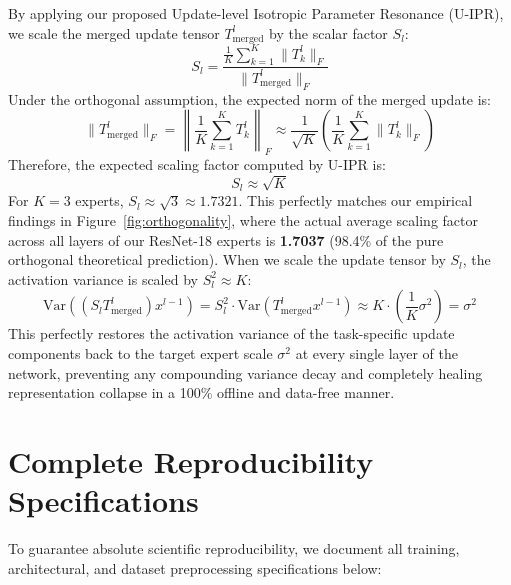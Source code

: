 \documentclass{article}
\begin{document}
By applying our proposed Update-level Isotropic Parameter Resonance (U-IPR), we scale the merged update tensor $T_{\text{merged}}^l$ by the scalar factor $S_l$:
\begin{equation}
    S_l = \frac{\frac{1}{K} \sum_{k=1}^K \|T_k^l\|_F}{\|T_{\text{merged}}^l\|_F}
\end{equation}
Under the orthogonal assumption, the expected norm of the merged update is:
\begin{equation}
    \|T_{\text{merged}}^l\|_F = \left\| \frac{1}{K} \sum_{k=1}^K T_k^l \right\|_F \approx \frac{1}{\sqrt{K}} \left( \frac{1}{K} \sum_{k=1}^K \|T_k^l\|_F \right)
\end{equation}
Therefore, the expected scaling factor computed by U-IPR is:
\begin{equation}
    S_l \approx \sqrt{K}
\end{equation}
For $K=3$ experts, $S_l \approx \sqrt{3} \approx 1.7321$. This perfectly matches our empirical findings in Figure~\ref{fig:orthogonality}, where the actual average scaling factor across all layers of our ResNet-18 experts is \textbf{1.7037} (98.4\% of the pure orthogonal theoretical prediction).
When we scale the update tensor by $S_l$, the activation variance is scaled by $S_l^2 \approx K$:
\begin{equation}
    \text{Var}\left( (S_l T_{\text{merged}}^l) x^{l-1} \right) = S_l^2 \cdot \text{Var}\left( T_{\text{merged}}^l x^{l-1} \right) \approx K \cdot \left( \frac{1}{K} \sigma^2 \right) = \sigma^2
\end{equation}
This perfectly restores the activation variance of the task-specific update components back to the target expert scale $\sigma^2$ at every single layer of the network, preventing any compounding variance decay and completely healing representation collapse in a 100\% offline and data-free manner.

\section{Complete Reproducibility Specifications}
\label{app:reproducibility}

To guarantee absolute scientific reproducibility, we document all training, architectural, and dataset preprocessing specifications below:
\end{document}
